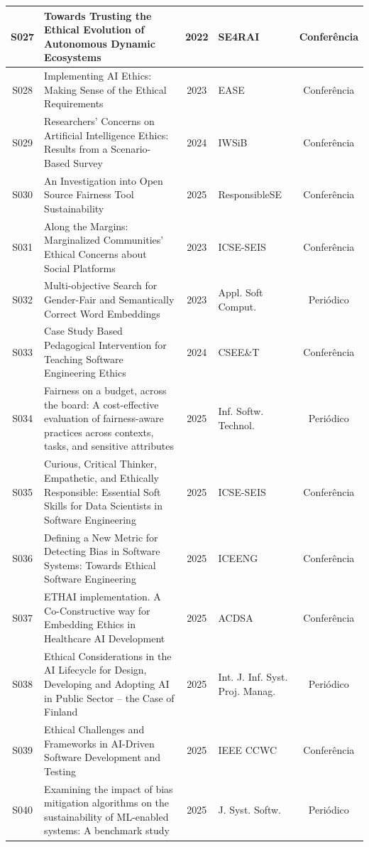 \begin{longtable}{|c|p{7cm}|c|p{3.5cm}|c|}
S027 & Towards Trusting the Ethical Evolution of Autonomous Dynamic Ecosystems & 2022 & SE4RAI & Conferência \\ \hline
S028 & Implementing AI Ethics: Making Sense of the Ethical Requirements & 2023 & EASE & Conferência \\ \hline
S029 & Researchers' Concerns on Artificial Intelligence Ethics: Results from a Scenario-Based Survey & 2024 & IWSiB & Conferência \\ \hline
S030 & An Investigation into Open Source Fairness Tool Sustainability & 2025 & ResponsibleSE & Conferência \\ \hline
S031 & Along the Margins: Marginalized Communities' Ethical Concerns about Social Platforms & 2023 & ICSE-SEIS & Conferência \\ \hline
S032 & Multi-objective Search for Gender-Fair and Semantically Correct Word Embeddings & 2023 & Appl. Soft Comput. & Periódico \\ \hline
S033 & Case Study Based Pedagogical Intervention for Teaching Software Engineering Ethics & 2024 & CSEE\&T & Conferência \\ \hline
S034 & Fairness on a budget, across the board: A cost-effective evaluation of fairness-aware practices across contexts, tasks, and sensitive attributes & 2025 & Inf. Softw. Technol. & Periódico \\ \hline
S035 & Curious, Critical Thinker, Empathetic, and Ethically Responsible: Essential Soft Skills for Data Scientists in Software Engineering & 2025 & ICSE-SEIS & Conferência \\ \hline
S036 & Defining a New Metric for Detecting Bias in Software Systems: Towards Ethical Software Engineering & 2025 & ICEENG & Conferência \\ \hline
S037 & ETHAI implementation. A Co-Constructive way for Embedding Ethics in Healthcare AI Development & 2025 & ACDSA & Conferência \\ \hline
S038 & Ethical Considerations in the AI Lifecycle for Design, Developing and Adopting AI in Public Sector -- the Case of Finland & 2025 & Int. J. Inf. Syst. Proj. Manag. & Periódico \\ \hline
S039 & Ethical Challenges and Frameworks in AI-Driven Software Development and Testing & 2025 & IEEE CCWC & Conferência \\ \hline
S040 & Examining the impact of bias mitigation algorithms on the sustainability of ML-enabled systems: A benchmark study & 2025 & J. Syst. Softw. & Periódico \\ \hline

\end{longtable}
